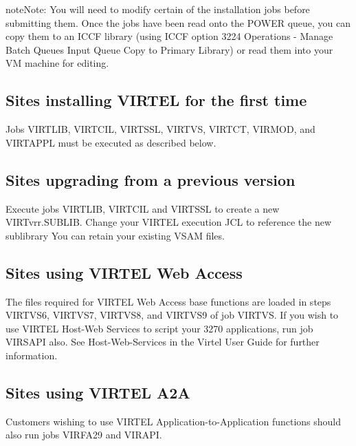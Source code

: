 \documentclass[letterpaper,10pt,english]{sphinxmanual}
\begin{document}
\begin{sphinxadmonition}{note}{Note:}
You will need to modify certain of the installation jobs before submitting them. Once the jobs have been read onto the POWER queue, you can copy them to an ICCF library (using ICCF option 3224 Operations - Manage Batch Queues \textendash{} Input Queue \textendash{} Copy to Primary Library) or read them into your VM machine for editing.
\end{sphinxadmonition}


\subsection{Sites installing VIRTEL for the first time}
\label{\detokenize{Installation_Guide:sites-installing-virtel-for-the-first-time}}
Jobs VIRTLIB, VIRTCIL, VIRTSSL, VIRTVS, VIRTCT, VIRMOD, and VIRTAPPL must be executed as described below.


\subsection{Sites upgrading from a previous version}
\label{\detokenize{Installation_Guide:sites-upgrading-from-a-previous-version}}
Execute jobs VIRTLIB, VIRTCIL and VIRTSSL to create a new VIRTvrr.SUBLIB. Change your VIRTEL execution JCL to reference the new sublibrary You can retain your existing VSAM files.


\subsection{Sites using VIRTEL Web Access}
\label{\detokenize{Installation_Guide:sites-using-virtel-web-access}}
The files required for VIRTEL Web Access base functions are loaded in steps VIRTVS6, VIRTVS7, VIRTVS8, and VIRTVS9 of job VIRTVS. If you wish to use VIRTEL Host-Web Services to script your 3270 applications, run job VIRSAPI also. See Host-Web-Services in the Virtel User Guide for further information.


\subsection{Sites using VIRTEL A2A}
\label{\detokenize{Installation_Guide:sites-using-virtel-a2a}}
Customers wishing to use VIRTEL Application-to-Application functions should also run jobs VIRFA29 and VIRAPI.
\end{document}
